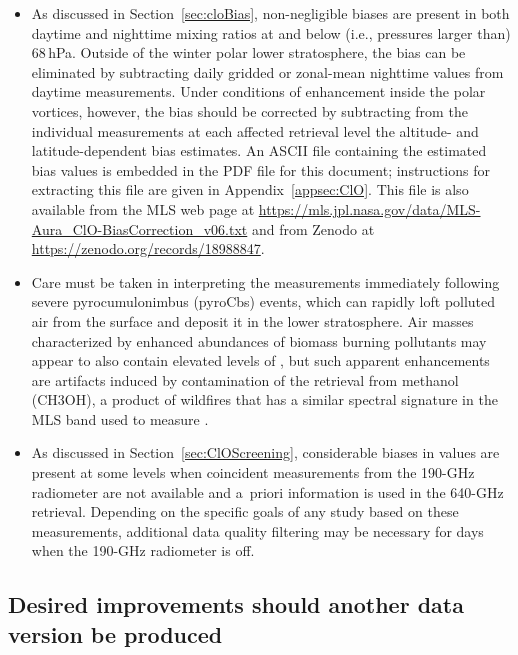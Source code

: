 \begin{itemize}
  \item As discussed in Section~\ref{sec:cloBias}, non-negligible biases are present in both daytime and nighttime \thisv {} mixing ratios at and below (i.e., pressures larger than) 68\,hPa. Outside of the winter polar lower stratosphere, the bias can be eliminated by subtracting daily gridded or zonal-mean nighttime values from daytime measurements. Under conditions of  enhancement inside the polar vortices, however, the bias should be corrected by subtracting from the individual measurements at each affected retrieval level the altitude- and latitude-dependent bias estimates. An ASCII file containing the estimated  bias values is embedded in the PDF file for this document; instructions for extracting this file are given in Appendix~\ref{appsec:ClO}. This file is also available from the MLS web page at \url{https://mls.jpl.nasa.gov/data/MLS-Aura_ClO-BiasCorrection_v06.txt} and from Zenodo at \url{https://zenodo.org/records/18988847}.
  \item Care must be taken in interpreting the  measurements immediately following severe pyrocumulonimbus (pyroCbs) events, which can rapidly loft polluted air from the surface and deposit it in the lower stratosphere. Air masses characterized by enhanced abundances of biomass burning pollutants may appear to also contain elevated levels of , but such apparent enhancements are artifacts induced by contamination of the  retrieval from methanol (CH\cs3OH), a product of wildfires that has a similar spectral signature in the MLS band used to measure \@.
  \item As discussed in Section~\ref{sec:ClOScreening}, considerable biases in  values are present at some levels when coincident measurements from the \mbox{190\nobreakdash-GHz} radiometer are not available and  a~priori information is used in the \mbox{640\nobreakdash-GHz}  retrieval. Depending on the specific goals of any study based on these measurements, additional  data quality filtering may be necessary for days when the \mbox{190\nobreakdash-GHz} radiometer is off.
\end{itemize}

\subsection{Desired improvements should another data version be produced}
 
